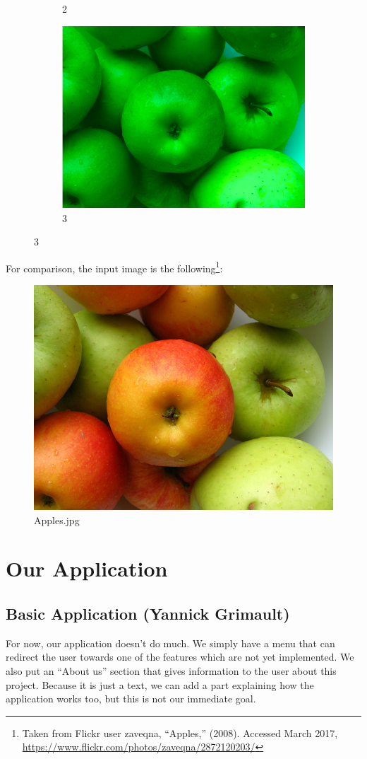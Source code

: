\documentclass[12pt]{article}
\begin{document}
\begin{figure}[h]
\begin{subfigure}{.33\textwidth}
	\caption*{2}
\end{subfigure}%
\begin{subfigure}{.33\textwidth}
	\centering
	\includegraphics[width=.9\linewidth]{AnimalVision/3.png}
	\caption*{3}
\end{subfigure}
\end{figure}

For comparison, the input image is the following\footnote{Taken from Flickr user zaveqna, “Apples,” (2008). Accessed March 2017, \url{https://www.flickr.com/photos/zaveqna/2872120203/}}:

\begin{figure}[h]
	\centering
	\includegraphics[width=.3\linewidth]{apples.jpg}
	\caption*{Apples.jpg}
\end{figure}


\section{Our Application}
\subsection{Basic Application (Yannick Grimault)}

For now, our application doesn't do much. We simply have a menu that can redirect the user towards one of the features which are not yet implemented. We also put an ``About us'' section that gives information to the user about this project. Because it is just a text, we can add a part explaining how the application works too, but this is not our immediate goal.
\end{document}
